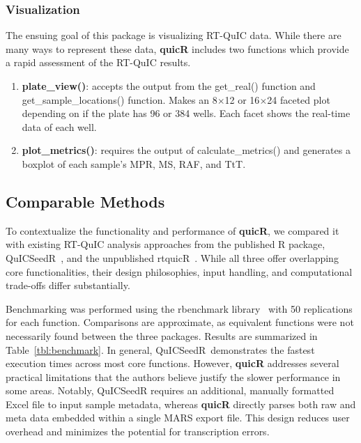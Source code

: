 \documentclass[preprint,12pt,a4paper]{elsarticle}
\begin{document}
            \subsubsection{Visualization}
                The ensuing goal of this package is visualizing RT-QuIC data. While there are many ways to represent these data, \textbf{quicR} includes two functions which provide a rapid assessment of the RT-QuIC results.
                \begin{enumerate}
                    \item \textbf{plate\_view()}: accepts the output from the get\_real() function and get\_sample\_locations() function. Makes an 8$\times$12 or 16$\times$24 faceted plot depending on if the plate has 96 or 384 wells. Each facet shows the real-time data of each well.
                    \item \textbf{plot\_metrics()}: requires the output of calculate\_metrics() and generates a boxplot of each sample's MPR, MS, RAF, and TtT.
                \end{enumerate}
        
        \subsection{Comparable Methods}
            To contextualize the functionality and performance of \textbf{quicR}, we compared it with existing RT-QuIC analysis approaches from the published R package, QuICSeedR\ \cite{Li2025}, and the unpublished rtquicR\ \cite{Slota2023}. While all three offer overlapping core functionalities, their design philosophies, input handling, and computational trade-offs differ substantially.

            Benchmarking was performed using the rbenchmark library~\cite{rbenchmark} with 50 replications for each function. Comparisons are approximate, as equivalent functions were not necessarily found between the three packages. Results are summarized in Table~\ref{tbl:benchmark}. In general, QuICSeedR\ demonstrates the fastest execution times across most core functions. However, \textbf{quicR} addresses several practical limitations that the authors believe justify the slower performance in some areas. Notably, QuICSeedR requires an additional, manually formatted Excel file to input sample metadata, whereas \textbf{quicR} directly parses both raw and meta data embedded within a single MARS export file. This design reduces user overhead and minimizes the potential for transcription errors.
\end{document}
